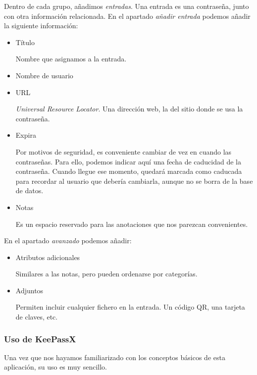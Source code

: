 \documentclass[a4paper,12pt]{article}
\begin{document}
Dentro de cada grupo, añadimos \emph{entradas}. Una entrada es una contraseña,
junto con otra información relacionada. En el apartado \emph{añadir entrada}
podemos añadir la siguiente información:

\begin{itemize}
\item
Título

Nombre que asignamos a la entrada.
\item
Nombre de usuario

\item
URL

\emph{Universal Resource Locator}. Una dirección web, la del sitio
donde se usa la contraseña.

\item
Expira

Por motivos de seguridad, es conveniente cambiar de vez en cuando las contraseñas.
Para ello, podemos indicar aquí una fecha de caducidad de la contraseña.
Cuando llegue ese momento, quedará marcada como caducada para recordar al
usuario que debería cambiarla, aunque no se borra de la base de datos.

\item
Notas

Es un espacio reservado para las anotaciones que nos parezcan convenientes.
\end{itemize}


En el apartado \emph{avanzado} podemos añadir:

\begin{itemize}
\item
Atributos adicionales

Similares a las notas, pero pueden ordenarse por categorías.

\item
Adjuntos

Permiten incluir cualquier fichero en la entrada. Un código QR, una tarjeta
de claves, etc.
\end{itemize}

\subsubsection{Uso de KeePassX}

Una vez que nos hayamos familiarizado con los conceptos básicos de esta aplicación,
su uso es muy sencillo. 
\end{document}
